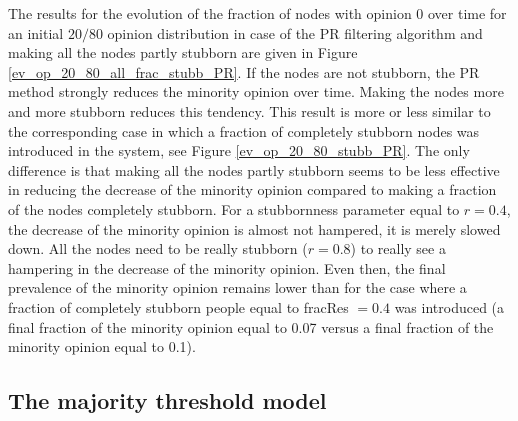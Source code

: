 \documentclass[11 pt , letterpaper , twoside , openright]{book}
\begin{document}
\noindent
The results for the evolution of the fraction of nodes with opinion 0 over time for an initial $20/80$ opinion distribution in case of the PR filtering algorithm and making all the nodes partly stubborn are given in Figure \ref{ev_op_20_80_all_frac_stubb_PR}. If the nodes are not stubborn, the PR method strongly reduces the minority opinion over time. Making the nodes more and more stubborn reduces this tendency. This result is more or less similar to the corresponding case in which a fraction of completely stubborn nodes was introduced in the system, see Figure \ref{ev_op_20_80_stubb_PR}. The only difference is that making all the nodes partly stubborn seems to be less effective in reducing the decrease of the minority opinion compared to making a fraction of the nodes completely stubborn. For a stubbornness parameter equal to $r=0.4$, the decrease of the minority opinion is almost not hampered, it is merely slowed down. All the nodes need to be really stubborn ($r=0.8$) to really see a hampering in the decrease of the minority opinion. Even then, the final prevalence of the minority opinion remains lower than for the case where a fraction of completely stubborn people equal to fracRes $=0.4$ was introduced (a final fraction  of the minority opinion equal to 0.07 versus a final fraction of the minority opinion equal to 0.1). 

\subsection{The majority threshold model}
\label{majThres}
\end{document}

